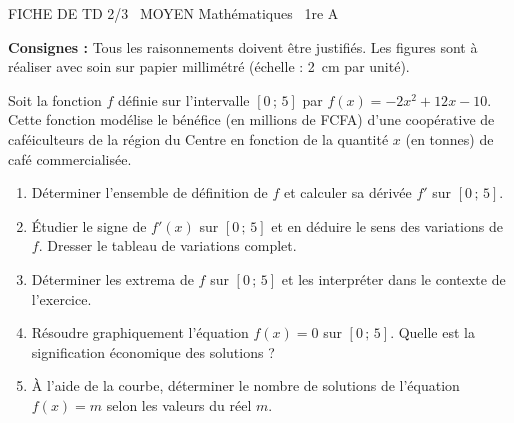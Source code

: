 \documentclass[11pt]{article}
\begin{document}
\begin{tcolorbox}[enhanced,colback=popink,colframe=popink,arc=10pt,boxrule=0pt,left=12pt,right=12pt,top=9pt,bottom=9pt]
{\color{white}\popxbold\small FICHE DE TD 2/3 \textbullet\ MOYEN \hfill Mathématiques \textbullet\ 1re A\par}
\end{tcolorbox}
\vspace{4pt}
\noindent\textbf{Consignes :} Tous les raisonnements doivent être justifiés. Les figures sont à réaliser avec soin sur papier millimétré (échelle : \SI{2}{cm} par unité).

\begin{exercice}
Soit la fonction $f$ définie sur l'intervalle $[0\,;\,5]$ par $f(x) = -2x^2 + 12x - 10$. Cette fonction modélise le bénéfice (en millions de FCFA) d'une coopérative de caféiculteurs de la région du Centre en fonction de la quantité $x$ (en tonnes) de café commercialisée.
\begin{enumerate}
    \item Déterminer l'ensemble de définition de $f$ et calculer sa dérivée $f'$ sur $[0\,;\,5]$.
    \item Étudier le signe de $f'(x)$ sur $[0\,;\,5]$ et en déduire le sens des variations de $f$. Dresser le tableau de variations complet.
    \item Déterminer les extrema de $f$ sur $[0\,;\,5]$ et les interpréter dans le contexte de l'exercice.
    \item Résoudre graphiquement l'équation $f(x) = 0$ sur $[0\,;\,5]$. Quelle est la signification économique des solutions ?
    \item À l'aide de la courbe, déterminer le nombre de solutions de l'équation $f(x) = m$ selon les valeurs du réel $m$.
\end{enumerate}
\end{exercice}
\end{document}
